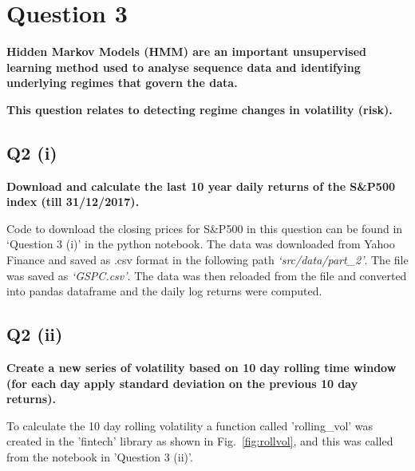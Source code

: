 \section{Question 3}\label{ssec:pt2q3}
\textbf{Hidden Markov Models (HMM) are an important unsupervised learning method used to analyse sequence data and identifying underlying regimes that govern the data.}

\noindent
\textbf{This question relates to detecting regime changes in volatility (risk).}

\subsection{Q2 (i)}\label{sssec:pt2q3i}
\textbf{Download and calculate the last 10 year daily returns of the S\&P500 index (till 31/12/2017).}

\noindent
Code to download the closing prices for S\&P500 in this question can be found in ‘Question 3 (i)’ in the python notebook. The data was downloaded from Yahoo Finance and saved as .csv format in the following path \textit{‘src/data/part\_2’}. The file was saved as \textit{‘GSPC.csv’}. The data was then reloaded from the file and converted into pandas dataframe and the daily log returns were computed.

\subsection{Q2 (ii)}\label{sssec:pt2q3ii}
\textbf{Create a new series of volatility based on 10 day rolling time window (for each day apply standard deviation on the previous 10 day returns).}

\noindent
To calculate the 10 day rolling volatility a function called 'rolling\_vol' was created in the 'fintech' library as shown in Fig.~\ref{fig:rollvol}, and this was called from the notebook in 'Question 3 (ii)'. 

